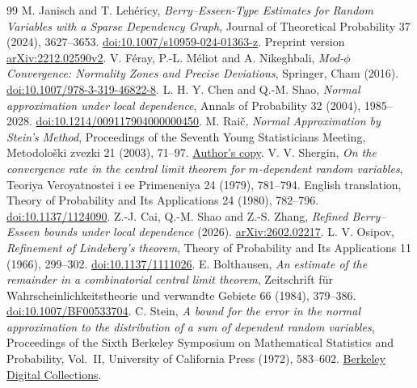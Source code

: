 \documentclass[11pt,a4paper]{article}
\begin{document}
\begin{thebibliography}{99}
 M. Janisch and T. Lehéricy, \emph{Berry--Esseen-Type Estimates for Random Variables with a Sparse Dependency Graph}, Journal of Theoretical Probability 37 (2024), 3627--3653. \href{https://doi.org/10.1007/s10959-024-01363-z}{doi:10.1007/s10959-024-01363-z}. Preprint version \href{https://arxiv.org/abs/2212.02590v2}{arXiv:2212.02590v2}.
 V. Féray, P.-L. Méliot and A. Nikeghbali, \emph{Mod-$\phi$ Convergence: Normality Zones and Precise Deviations}, Springer, Cham (2016). \href{https://doi.org/10.1007/978-3-319-46822-8}{doi:10.1007/978-3-319-46822-8}.
 L. H. Y. Chen and Q.-M. Shao, \emph{Normal approximation under local dependence}, Annals of Probability 32 (2004), 1985--2028. \href{https://doi.org/10.1214/009117904000000450}{doi:10.1214/009117904000000450}.
 M. Raič, \emph{Normal Approximation by Stein's Method}, Proceedings of the Seventh Young Statisticians Meeting, Metodološki zvezki 21 (2003), 71--97. \href{https://www.researchgate.net/publication/313558727_Normal_approximation_by_Stein\%27s_method}{Author's copy}.
 V. V. Shergin, \emph{On the convergence rate in the central limit theorem for $m$-dependent random variables}, Teoriya Veroyatnostei i ee Primeneniya 24 (1979), 781--794. English translation, Theory of Probability and Its Applications 24 (1980), 782--796. \href{https://doi.org/10.1137/1124090}{doi:10.1137/1124090}.
 Z.-J. Cai, Q.-M. Shao and Z.-S. Zhang, \emph{Refined Berry--Esseen bounds under local dependence} (2026). \href{https://arxiv.org/abs/2602.02217}{arXiv:2602.02217}.
 L. V. Osipov, \emph{Refinement of Lindeberg's theorem}, Theory of Probability and Its Applications 11 (1966), 299--302. \href{https://doi.org/10.1137/1111026}{doi:10.1137/1111026}.
 E. Bolthausen, \emph{An estimate of the remainder in a combinatorial central limit theorem}, Zeitschrift für Wahrscheinlichkeitstheorie und verwandte Gebiete 66 (1984), 379--386. \href{https://doi.org/10.1007/BF00533704}{doi:10.1007/BF00533704}.
 C. Stein, \emph{A bound for the error in the normal approximation to the distribution of a sum of dependent random variables}, Proceedings of the Sixth Berkeley Symposium on Mathematical Statistics and Probability, Vol.~II, University of California Press (1972), 583--602. \href{https://digicoll.lib.berkeley.edu/record/113245}{Berkeley Digital Collections}.
\end{thebibliography}
\end{document}
